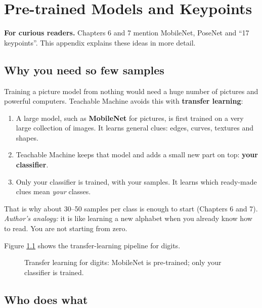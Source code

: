 \chapter{Pre-trained Models and Keypoints}

\begin{notebox}
\textbf{For curious readers.} Chapters 6 and 7 mention MobileNet, PoseNet and “17 keypoints”. This appendix explains these ideas in more detail.
\end{notebox}

\section{Why you need so few samples}

Training a picture model from nothing would need a huge number of pictures and powerful computers. Teachable Machine avoids this with \textbf{transfer learning}:


\begin{enumerate}
\item A large model, such as \textbf{MobileNet} for pictures, is first trained on a very large collection of images. It learns general clues: edges, curves, textures and shapes.
\item Teachable Machine keeps that model and adds a small new part on top: \textbf{your classifier}.
\item Only your classifier is trained, with your samples. It learns which ready-made clues mean \emph{your} classes.
\end{enumerate}

That is why about 30–50 samples per class is enough to start (Chapters 6 and 7). \emph{Author’s analogy:} it is like learning a new alphabet when you already know how to read. You are not starting from zero.


Figure \ref{fig:mobilenet-pipeline-2} shows the transfer-learning pipeline for digits.


\begin{figure}[htbp]
\centering
{}
\caption{Transfer learning for digits: MobileNet is pre-trained; only your classifier is trained.}\label{fig:mobilenet-pipeline-2}
\end{figure}

\section{Who does what}

